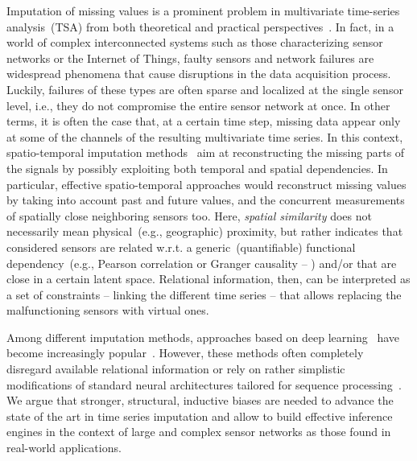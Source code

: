 \documentclass{article} \usepackage{iclr2022_conference,times}
\begin{document}
Imputation of missing values is a prominent problem in multivariate time-series analysis~(TSA) from both theoretical and practical perspectives~\citep{little2019statistical}. In fact, in a world of complex interconnected systems such as those characterizing sensor networks or the Internet of Things, faulty sensors and network failures are widespread phenomena that cause disruptions in the data acquisition process. Luckily, failures of these types are often sparse and localized at the single sensor level, i.e., they do not compromise the entire sensor network at once. In other terms, it is often the case that, at a certain time step, missing data appear only at some of the channels of the resulting multivariate time series. In this context, spatio-temporal imputation methods~\citep{yi2016stmvl, yoon2018estimating} aim at reconstructing the missing parts of the signals by possibly exploiting both temporal and spatial dependencies. In particular, effective spatio-temporal approaches would reconstruct missing values by taking into account past and future values, and the concurrent measurements of spatially close neighboring sensors too. Here, \emph{spatial similarity} does not necessarily mean physical~(e.g., geographic) proximity, but rather indicates that considered sensors are related w.r.t. a generic~(quantifiable) functional dependency~(e.g., Pearson correlation or Granger causality -- \citealp{granger1969investigating}) and/or that are close in a certain latent space. Relational information, then, can be interpreted as a set of constraints -- linking the different time series -- that allows replacing the malfunctioning sensors with virtual ones.

Among different imputation methods, approaches based on deep learning~\citep{lecun2015deep, schmidhuber2015deep, goodfellow2016deep} have become increasingly popular~\citep{yoon2018gain, cao2018brits, liu2019naomi}. However, these methods often completely disregard available relational information or rely on rather simplistic modifications of standard neural architectures tailored for sequence processing~\citep{hochreiter1997long, chung2014empirical, bai2018empirical, vaswani2017attention}. We argue that stronger, structural, inductive biases are needed to advance the state of the art in time series imputation and allow to build effective inference engines in the context of large and complex sensor networks as those found in real-world applications.
\end{document}
